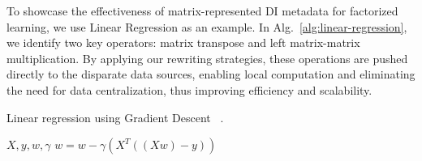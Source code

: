 To showcase the effectiveness of matrix-represented DI metadata for factorized learning, we use Linear Regression as an example. In Alg.~\ref{alg:linear-regression}, we identify two key operators: matrix transpose and left matrix-matrix multiplication. By applying our rewriting strategies, these operations are pushed directly to the disparate data sources, enabling local computation and eliminating the need for data centralization, thus improving efficiency and scalability.

\begin{algorithm}[t!]
  \caption[Linear regression]{Linear regression using Gradient Descent
    ~\cite{chen2017towards}.}\label{alg:linear-regression}
  \begin{algorithmic}
    \Require $X, y , w, \gamma$
     \State $w = w - \gamma (\text{{$X^T$}}((\text{{$X w$}}) - y))$
    \EndFor
  \end{algorithmic}
\end{algorithm}





